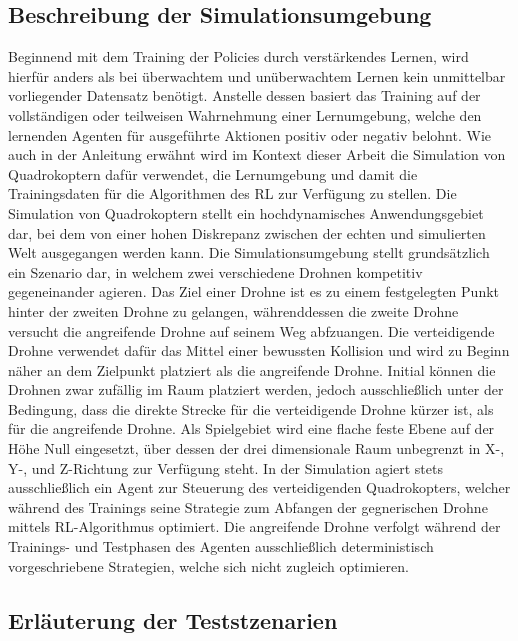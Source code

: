 \subsection{Beschreibung der Simulationsumgebung}

Beginnend mit dem Training der Policies durch verstärkendes Lernen, wird hierfür anders als bei überwachtem und unüberwachtem Lernen kein unmittelbar vorliegender Datensatz benötigt.
Anstelle dessen basiert das Training auf der vollständigen oder teilweisen Wahrnehmung einer Lernumgebung, welche den lernenden Agenten für ausgeführte Aktionen positiv oder negativ belohnt.
Wie auch in der Anleitung erwähnt wird im Kontext dieser Arbeit die Simulation von Quadrokoptern dafür verwendet, die Lernumgebung und damit die Trainingsdaten für die Algorithmen des RL zur Verfügung zu stellen.
Die Simulation von Quadrokoptern stellt ein hochdynamisches Anwendungsgebiet dar, bei dem von einer hohen Diskrepanz zwischen der echten und simulierten Welt ausgegangen werden kann. 
Die Simulationsumgebung stellt grundsätzlich ein Szenario dar, in welchem zwei verschiedene Drohnen kompetitiv gegeneinander agieren.
Das Ziel einer Drohne ist es zu einem festgelegten Punkt hinter der zweiten Drohne zu gelangen, währenddessen die zweite Drohne versucht die angreifende Drohne auf seinem Weg abfzuangen. 
Die verteidigende Drohne verwendet dafür das Mittel einer bewussten Kollision und wird zu Beginn näher an dem Zielpunkt platziert als die angreifende Drohne. 
Initial können die Drohnen zwar zufällig im Raum platziert werden, jedoch ausschließlich unter der Bedingung, dass die direkte Strecke für die verteidigende Drohne kürzer ist, als für die angreifende Drohne.
Als Spielgebiet wird eine flache feste Ebene auf der Höhe Null eingesetzt, über dessen der drei dimensionale Raum unbegrenzt in X-, Y-, und Z-Richtung zur Verfügung steht.
In der Simulation agiert stets ausschließlich ein Agent zur Steuerung des verteidigenden Quadrokopters, welcher während des Trainings seine Strategie zum Abfangen der gegnerischen Drohne mittels RL-Algorithmus optimiert. 
Die angreifende Drohne verfolgt während der Trainings- und Testphasen des Agenten ausschließlich deterministisch vorgeschriebene Strategien, welche sich nicht zugleich optimieren.

\subsection{Erläuterung der Teststzenarien}

